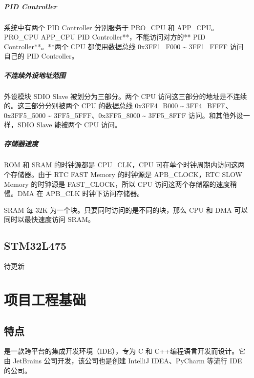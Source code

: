 \documentclass[a4paper,12pt,english]{sphinxmanual}
\begin{document}
\subparagraph{ PID Controller }
\label{\detokenize{dev-board/esp32:pid-controller}}
\sphinxAtStartPar
系统中有两个 PID Controller 分别服务于 PRO\_CPU 和 APP\_CPU。PRO\_CPU  APP\_CPU  PID Controller**，不能访问对方的** PID Controller**。**两个 CPU 都使用数据总线 0x3FF1\_F000 \textasciitilde{} 3FF1\_FFFF 访问自己的 PID Controller。


\subparagraph{不连续外设地址范围}
\label{\detokenize{dev-board/esp32:id14}}
\sphinxAtStartPar
外设模块 SDIO Slave 被划分为三部分。两个 CPU 访问这三部分的地址是不连续的。这三部分分别被两个 CPU 的数据总线 0x3FF4\_B000 \textasciitilde{} 3FF4\_BFFF、0x3FF5\_5000 \textasciitilde{} 3FF5\_5FFF、0x3FF5\_8000 \textasciitilde{} 3FF5\_8FFF 访问。和其他外设一样，SDIO Slave 能被两个 CPU 访问。


\subparagraph{存储器速度}
\label{\detokenize{dev-board/esp32:id15}}
\sphinxAtStartPar
ROM 和 SRAM 的时钟源都是 CPU\_CLK，CPU 可在单个时钟周期内访问这两个存储器。由于 RTC FAST Memory 的时钟源是 APB\_CLOCK，RTC SLOW Memory 的时钟源是 FAST\_CLOCK，所以 CPU 访问这两个存储器的速度稍慢。DMA 在 APB\_CLK 时钟下访问存储器。

\sphinxAtStartPar
SRAM 每 32K 为一个块。只要同时访问的是不同的块，那么 CPU 和 DMA 可以同时以最快速度访问 SRAM。

\sphinxstepscope


\subsection{STM32L475}
\label{\detokenize{dev-board/stm32l475:stm32l475}}\label{\detokenize{dev-board/stm32l475::doc}}
\sphinxAtStartPar
待更新

\sphinxstepscope


\section{ 项目工程基础}
\label{\detokenize{dev-board/clion:clion}}\label{\detokenize{dev-board/clion::doc}}

\subsection{ 特点}
\label{\detokenize{dev-board/clion:id1}}
\sphinxAtStartPar
{} 是一款跨平台的集成开发环境（IDE），专为 C 和 C++编程语言开发而设计。它由 JetBrains 公司开发，该公司也是创建 IntelliJ IDEA、PyCharm 等流行 IDE 的公司。
\end{document}
